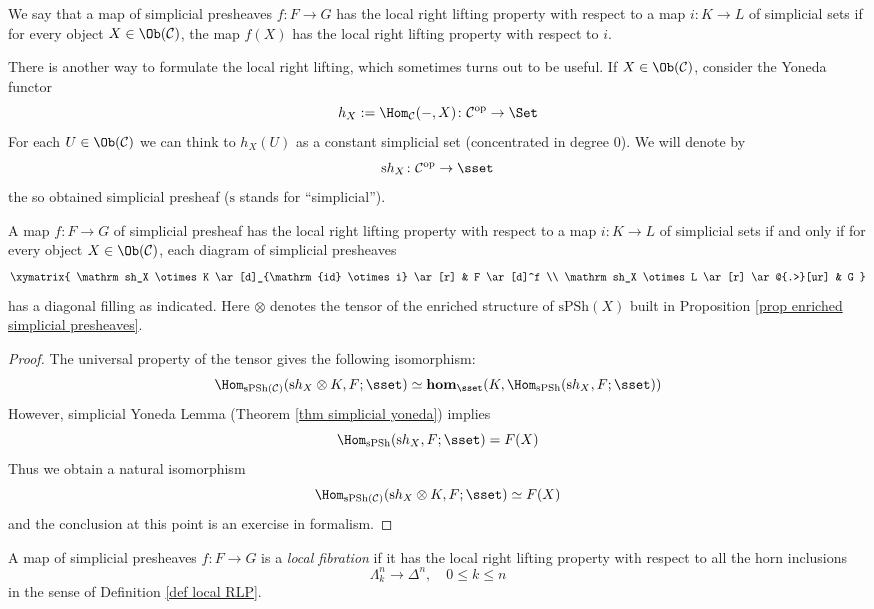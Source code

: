 \begin{defin} \label{def local RLP}
We say that a map of simplicial presheaves $f \colon F \to G$ has the local right lifting property with respect to a map $i \colon K \to L$ of simplicial sets if for every object $X \in \Ob(\mathcal C)$, the map $f(X)$ has the local right lifting property with respect to $i$.
\end{defin}

There is another way to formulate the local right lifting, which sometimes turns out to be useful. If $X \in \Ob(\mathcal C)$, consider the Yoneda functor
\[
h_X := \Hom_{\mathcal C}(-,X) \colon \mathcal C^{\mathrm{op}} \to \Set
\]
For each $U \in \Ob(\mathcal C)$ we can think to $h_X(U)$ as a constant simplicial set (concentrated in degree $0$). We will denote by
\[
\mathrm sh_X \colon \mathcal C^{\mathrm{op}} \to \sset
\]
the so obtained simplicial presheaf ($\mathrm s$ stands for ``simplicial'').

\begin{lemma}
A map $f \colon F \to G$ of simplicial presheaf has the local right lifting property with respect to a map $i \colon K \to L$ of simplicial sets if and only if for every object $X \in \Ob(\mathcal C)$, each diagram of simplicial presheaves
\[
\xymatrix{
\mathrm sh_X \otimes K \ar[d]_{\mathrm{id} \otimes i} \ar[r] & F \ar[d]^f \\ \mathrm sh_X \otimes L \ar[r] \ar@{.>}[ur] & G 
}
\]
has a diagonal filling as indicated. Here $\otimes$ denotes the tensor of the enriched structure of $\mathrm{sPSh}(X)$ built in Proposition \ref{prop enriched simplicial presheaves}.
\end{lemma}

\begin{proof}
The universal property of the tensor gives the following isomorphism:
\[
\Hom_{\mathrm{sPSh}(\mathcal C)}(\mathrm sh_X \otimes K, F;\sset) \simeq \mathbf{hom}_{\sset}(K, \Hom_{\mathrm{sPSh}}(\mathrm sh_X,F;\sset))
\]
However, simplicial Yoneda Lemma (Theorem \ref{thm simplicial yoneda}) implies
\[
\Hom_{\mathrm{sPSh}}(\mathrm sh_X,F;\sset) = F(X)
\]
Thus we obtain a natural isomorphism
\[
\Hom_{\mathrm{sPSh}(\mathcal C)}(\mathrm sh_X \otimes K, F;\sset) \simeq F(X)
\]
and the conclusion at this point is an exercise in formalism.
\end{proof}

\begin{defin} \label{def local fibration}
A map of simplicial presheaves $f \colon F \to G$ is a \emph{local fibration} if it has the local right lifting property with respect to all the horn inclusions
\[
\Lambda^n_k \to \Delta^n, \quad 0 \le k \le n
\]
in the sense of Definition \ref{def local RLP}.
\end{defin}

